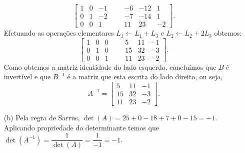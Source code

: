 \begin{solution}
\begin{enumerate}
$$\left[ \begin{array}{rrrr|rrrr}
 1 &  0 &  -1   & & &    -6 &  -12 &    1  \\
 0 &  1 &  -2   & & &    -7 &  -14 &    1  \\
 0 &  0 &   1   & & &    11 &   23 &   -2  
\end{array} \right] .$$
Efetuando as operações elementares $L_1 \leftarrow L_1 + L_3$ e $L_2 \leftarrow L_2 + 2L_3$ obtemos:
$$\left[ \begin{array}{rrrr|rrrr}
 1 &  0 &  0   & & &     5 &   11 &   -1  \\
 0 &  1 &  0   & & &    15 &   32 &   -3  \\
 0 &  0 &  1   & & &    11 &   23 &   -2  
\end{array} \right] .$$
Como obtemos a matriz identidade do lado esquerdo, concluímos que $B$ é invertível e que $B^{-1}$ é a matriz que esta escrita do lado direito, ou seja,
$$A^{-1} = \left[ \begin{array}{rrrr}
 5 &  11 & -1  \\
15 &  32 & -3  \\
11 &  23 & -2 
\end{array} \right] .$$

\item[(b)] Pela regra de Sarrus, $\det(A) = 25 + 0 - 18 + 7 + 0 - 15 = -1$. Aplicando propriedade do determinante temos que
$\det(A^{-1}) = \dfrac{1}{\det(A)} = \dfrac{1}{-1} = -1$.
\end{enumerate}
\end{solution}

